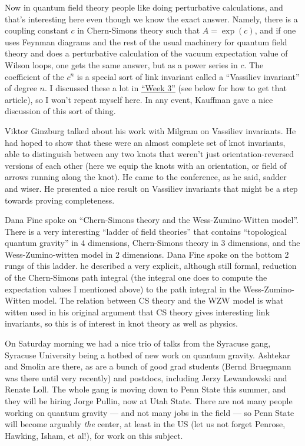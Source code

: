 \documentclass{article}
\begin{document}
Now in quantum field theory people like doing perturbative calculations,
and that's interesting here even though we know the exact answer.
Namely, there is a coupling constant \(c\) in Chern-Simons theory such
that \(A = \exp(c)\), and if one uses Feynman diagrams and the rest of
the usual machinery for quantum field theory and does a perturbative
calculation of the vacuum expectation value of Wilson loops, one gets
the same answer, but as a power series in \(c\). The coefficient of the
\(c^n\) is a special sort of link invariant called a ``Vassiliev
invariant'' of degree \(n\). I discussed these a lot in
\protect\hyperlink{week3}{``Week 3''} (see below for how to get that
article), so I won't repeat myself here. In any event, Kauffman gave a
nice discussion of this sort of thing.

Viktor Ginzburg talked about his work with Milgram on Vassiliev
invariants. He had hoped to show that these were an almost complete set
of knot invariants, able to distinguish between any two knots that
weren't just orientation-reversed versions of each other (here we equip
the knots with an orientation, or field of arrows running along the
knot). He came to the conference, as he said, sadder and wiser. He
presented a nice result on Vassiliev invariants that might be a step
towards proving completeness.

Dana Fine spoke on ``Chern-Simons theory and the Wess-Zumino-Witten
model''. There is a very interesting ``ladder of field theories'' that
contains ``topological quantum gravity'' in 4 dimensions, Chern-Simons
theory in 3 dimensions, and the Wess-Zumino-witten model in 2
dimensions. Dana Fine spoke on the bottom 2 rungs of this ladder. he
described a very explicit, although still formal, reduction of the
Chern-Simons path integral (the integral one does to compute the
expectation values I mentioned above) to the path integral in the
Wess-Zumino-Witten model. The relation between CS theory and the WZW
model is what witten used in his original argument that CS theory gives
interesting link invariants, so this is of interest in knot theory as
well as physics.

On Saturday morning we had a nice trio of talks from the Syracuse gang,
Syracuse University being a hotbed of new work on quantum gravity.
Ashtekar and Smolin are there, as are a bunch of good grad students
(Bernd Bruegmann was there until very recently) and postdocs, including
Jerzy Lewandowski and Renate Loll. The whole gang is moving down to Penn
State this summer, and they will be hiring Jorge Pullin, now at Utah
State. There are not many people working on quantum gravity --- and not
many jobs in the field --- so Penn State will become arguably \emph{the}
center, at least in the US (let us not forget Penrose, Hawking, Isham,
et al!), for work on this subject.
\end{document}
